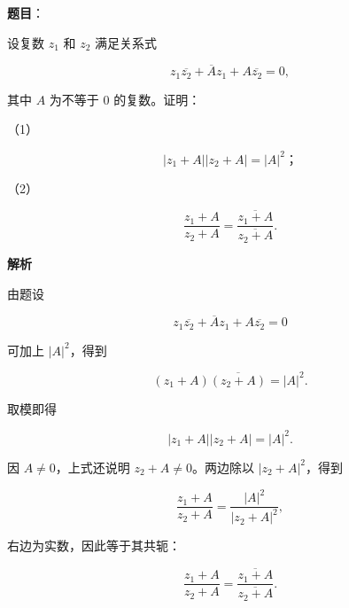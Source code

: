 \begin{answer}

\textbf{题目}：

设复数 $z_1$ 和 $z_2$ 满足关系式

\nopagebreak[4]
\[
z_1\overline{z_2}+\overline A z_1+A\overline{z_2}=0,
\]

其中 $A$ 为不等于 0 的复数。证明：

（1）　

\nopagebreak[4]
\[
|z_1+A||z_2+A|=|A|^2\text{；}
\]

（2）　

\nopagebreak[4]
\[
\frac{z_1+A}{z_2+A}
=\frac{\overline{z_1+A}}{\overline{z_2+A}}.
\]


\textbf{解析}


由题设

\nopagebreak[4]
\[
z_1\overline{z_2}+\overline A z_1+A\overline{z_2}=0
\]

可加上 $|A|^2$，得到

\nopagebreak[4]
\[
(z_1+A)\overline{(z_2+A)}=|A|^2.
\]

取模即得

\nopagebreak[4]
\[
|z_1+A||z_2+A|=|A|^2.
\]


因 $A\ne0$，上式还说明 $z_2+A\ne0$。两边除以 $|z_2+A|^2$，得到

\nopagebreak[4]
\[
\frac{z_1+A}{z_2+A}
=\frac{|A|^2}{|z_2+A|^2},
\]

右边为实数，因此等于其共轭：

\nopagebreak[4]
\[
\frac{z_1+A}{z_2+A}
=\frac{\overline{z_1+A}}{\overline{z_2+A}}.
\]



\end{answer}
